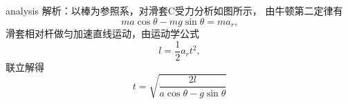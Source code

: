 \begin{example}
	
	\begin{taggedblock}{analysis}
		解析：以棒为参照系，对滑套C受力分析如图所示，
			由牛顿第二定律有
			\[
			ma\cos\theta-mg\sin\theta = ma_r,
			\]
		滑套相对杆做匀加速直线运动，由运动学公式
		\[
		l = \frac{1}{2}a_rt^2,
		\]
		联立解得
		\[
		t = \sqrt{\frac{2l}{a\cos\theta-g\sin\theta}} 
		\]
		
	\end{taggedblock}
\end{example}



